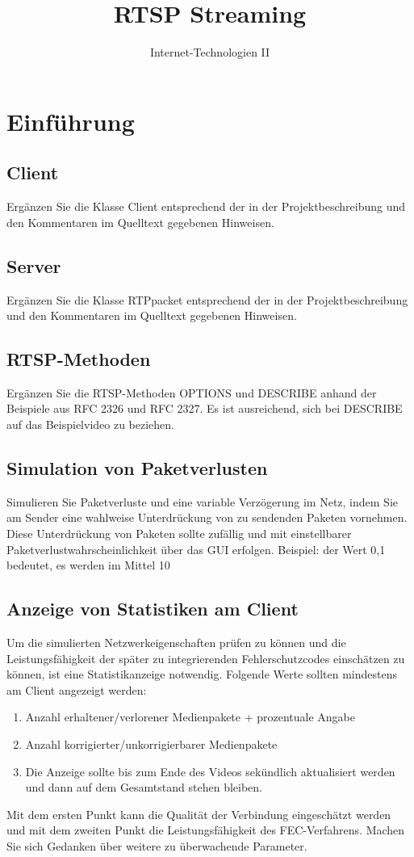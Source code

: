 \documentclass{scrartcl}
\title{RTSP Streaming}
\subtitle{Internet-Technologien II}
\author{Eric S.\texorpdfstring{\strut\\}{, }}
\begin{document}
\maketitle
\tableofcontents
\newpage

\section{Einführung}
\subsection{Client}
Ergänzen Sie die Klasse Client entsprechend der in der Projektbeschreibung und den Kommentaren im Quelltext gegebenen Hinweisen.
\subsection{Server}
Ergänzen Sie die Klasse RTPpacket entsprechend der in der Projektbeschreibung und den Kommentaren im Quelltext gegebenen Hinweisen.
\subsection{RTSP-Methoden}
Ergänzen Sie die RTSP-Methoden OPTIONS und DESCRIBE anhand der Beispiele aus RFC 2326 und RFC 2327. Es ist ausreichend, sich bei DESCRIBE auf das Beispielvideo zu beziehen.
\subsection{Simulation von Paketverlusten}
Simulieren Sie Paketverluste und eine variable Verzögerung im Netz, indem Sie am Sender eine wahlweise Unterdrückung von zu sendenden Paketen vornehmen. Diese Unterdrückung von Paketen sollte zufällig und mit einstellbarer Paketverlustwahrscheinlichkeit über das GUI erfolgen. Beispiel: der Wert 0,1 bedeutet, es werden im Mittel 10%
\subsection{Anzeige von Statistiken am Client}

Um die simulierten Netzwerkeigenschaften prüfen zu können und die Leistungsfähigkeit der später zu integrierenden Fehlerschutzcodes einschätzen zu können, ist eine Statistikanzeige notwendig. Folgende Werte sollten mindestens am Client angezeigt werden:
\begin{enumerate}
	\item Anzahl erhaltener/verlorener Medienpakete + prozentuale Angabe
	\item Anzahl korrigierter/unkorrigierbarer Medienpakete
	\item Die Anzeige sollte bis zum Ende des Videos sekündlich aktualisiert werden und dann auf dem Gesamtstand stehen bleiben.
\end{enumerate}
Mit dem ersten Punkt kann die Qualität der Verbindung eingeschätzt werden und mit dem zweiten Punkt die Leistungsfähigkeit des FEC-Verfahrens. Machen Sie sich Gedanken über weitere zu überwachende Parameter.
\end{document}

